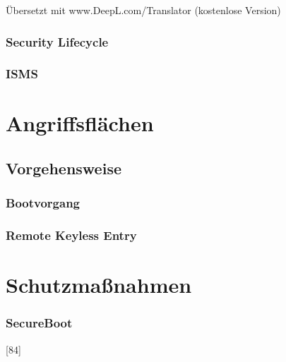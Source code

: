 %



Übersetzt mit www.DeepL.com/Translator (kostenlose Version)
\subsection{Security Lifecycle}
\cite{Wurm.2022}
\subsection{ISMS}


\chapter{Angriffsflächen}
\section{Vorgehensweise}
\cite[36]{Wurm.2022}

\subsection{Bootvorgang}
\cite{Wurm.2022}

\subsection{Remote Keyless Entry}
\cite{Garcia.2016}


\chapter{Schutzmaßnahmen}
\subsection{SecureBoot}
\cite{Wurm.2022}[84]